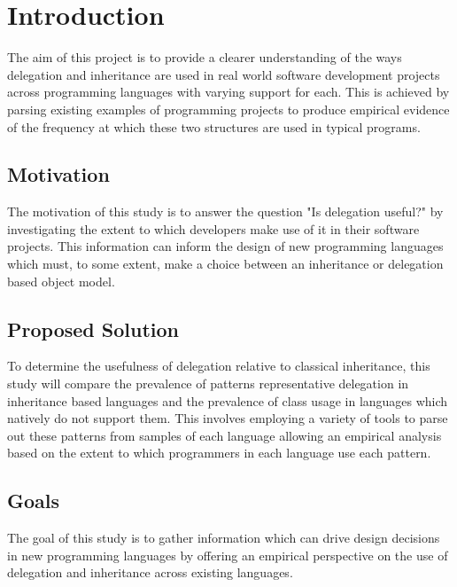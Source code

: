 \chapter{Introduction}\label{C:intro}
The aim of this project is to provide a clearer understanding of the ways delegation and inheritance are used in real world software development projects across programming languages with varying support for each. This is achieved by parsing existing examples of programming projects to produce empirical evidence of the frequency at which these two structures are used in typical programs.

\section{Motivation}
The motivation of this study is to answer the question "Is delegation useful?" by investigating the extent to which developers make use of it in their software projects. This information can inform the design of new programming languages which must, to some extent, make a choice between an inheritance or delegation based object model.

\section{Proposed Solution}
To determine the usefulness of delegation relative to classical inheritance, this study will compare the prevalence of patterns representative delegation in inheritance based languages and the prevalence of class usage in languages which natively do not support them. This involves employing a variety of tools to parse out these patterns from samples of each language allowing an empirical analysis based on the extent to which programmers in each language use each pattern.

\section{Goals}
The goal of this study is to gather information which can drive design decisions in new programming languages by offering an empirical perspective on the use of delegation and inheritance across existing languages. 